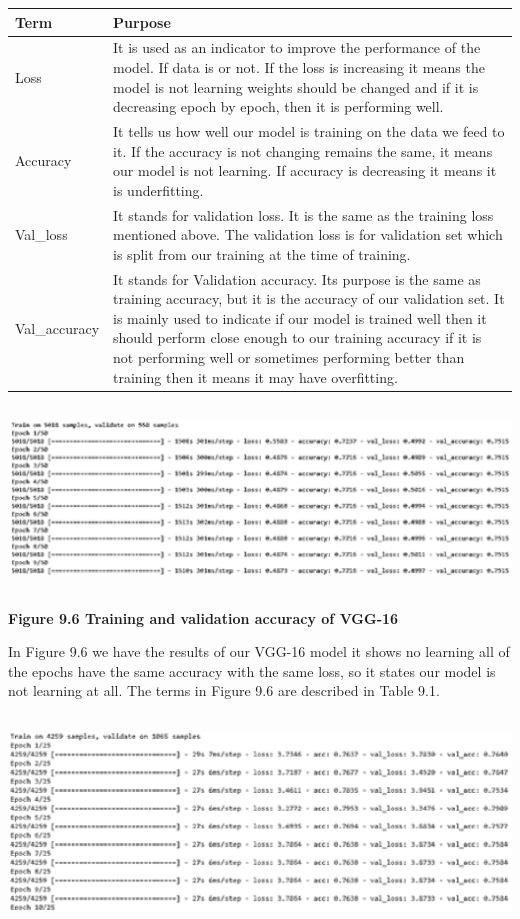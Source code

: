 \documentclass{article} %
\begin{document}
\begin{tabular}{|p{0.7in}|p{3.6in}|} \hline 
\textbf{Term} & \textbf{Purpose} \\ \hline 
Loss & It is used as an indicator to improve the performance of the model. If data is or not. If the loss is increasing it means the model is not learning weights should be changed and if it is decreasing epoch by epoch, then it is performing well. \\ \hline 
Accuracy & It tells us how well our model is training on the data we feed to it. If the accuracy is not changing remains the same, it means our model is not learning. If accuracy is decreasing it means it is underfitting. \\ \hline 
Val\_loss & It stands for validation loss. It is the same as the training loss mentioned above. The validation loss is for validation set which is split from our training at the time of training. \\ \hline 
Val\_accuracy & It stands for Validation accuracy. Its purpose is the same as training accuracy, but it is the accuracy of our validation set. It is mainly used to indicate if our model is trained well then it should perform close enough to our training accuracy if it is not performing well or sometimes performing better than training then it means it may have overfitting. \\ \hline 
\end{tabular}

\includegraphics*[width=6.31in, height=1.92in, keepaspectratio=false]{image47}

\noindent \textbf{Figure 9.6 Training and validation accuracy of VGG-16}

\noindent In Figure 9.6 we have the results of our VGG-16 model it shows no learning all of the epochs have the same accuracy with the same loss, so it states our model is not learning at all. The terms in Figure 9.6 are described in Table 9.1.

\noindent \includegraphics*[width=6.30in, height=2.22in, keepaspectratio=false]{image48}
\end{document}
